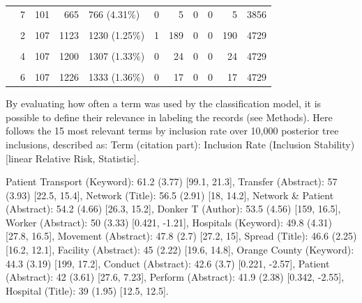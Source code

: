 \documentclass{article}
\begin{document}
\begin{table}[!h]
{\begin{tabular}[t]{llrrlrrrrrr}
 & 7 & 101 & 665 & 766 (4.31\%) & 0 & 5 & 0 & 0 & 5 & 3856\\
\cellcolor{gray!6}{Session2 (n = 98371)} & \cellcolor{gray!6}{1} & \cellcolor{gray!6}{106} & \cellcolor{gray!6}{934} & \cellcolor{gray!6}{1040 (1.06\%)} & \cellcolor{gray!6}{5} & \cellcolor{gray!6}{270} & \cellcolor{gray!6}{998} & \cellcolor{gray!6}{0} & \cellcolor{gray!6}{1273} & \cellcolor{gray!6}{4729}\\
 & 2 & 107 & 1123 & 1230 (1.25\%) & 1 & 189 & 0 & 0 & 190 & 4729\\
\addlinespace
\cellcolor{gray!6}{} & \cellcolor{gray!6}{3} & \cellcolor{gray!6}{107} & \cellcolor{gray!6}{1176} & \cellcolor{gray!6}{1283 (1.3\%)} & \cellcolor{gray!6}{0} & \cellcolor{gray!6}{53} & \cellcolor{gray!6}{0} & \cellcolor{gray!6}{0} & \cellcolor{gray!6}{53} & \cellcolor{gray!6}{4733}\\
 & 4 & 107 & 1200 & 1307 (1.33\%) & 0 & 24 & 0 & 0 & 24 & 4729\\
\cellcolor{gray!6}{} & \cellcolor{gray!6}{5} & \cellcolor{gray!6}{107} & \cellcolor{gray!6}{1209} & \cellcolor{gray!6}{1316 (1.34\%)} & \cellcolor{gray!6}{0} & \cellcolor{gray!6}{9} & \cellcolor{gray!6}{0} & \cellcolor{gray!6}{0} & \cellcolor{gray!6}{9} & \cellcolor{gray!6}{4729}\\
 & 6 & 107 & 1226 & 1333 (1.36\%) & 0 & 17 & 0 & 0 & 17 & 4729\\
\bottomrule
\end{tabular}}
\end{table}

By evaluating how often a term was used by the classification model, it
is possible to define their relevance in labeling the records (see
Methods). Here follows the 15 most relevant terms by inclusion rate over
10,000 posterior tree inclusions, described as: Term (citation part):
Inclusion Rate (Inclusion Stability) {[}linear Relative Risk,
Statistic{]}.

Patient Transport (Keyword): 61.2 (3.77) {[}99.1, 21.3{]}, Transfer
(Abstract): 57 (3.93) {[}22.5, 15.4{]}, Network (Title): 56.5 (2.91)
{[}18, 14.2{]}, Network \& Patient (Abstract): 54.2 (4.66) {[}26.3,
15.2{]}, Donker T (Author): 53.5 (4.56) {[}159, 16.5{]}, Worker
(Abstract): 50 (3.33) {[}0.421, -1.21{]}, Hospitals (Keyword): 49.8
(4.31) {[}27.8, 16.5{]}, Movement (Abstract): 47.8 (2.7) {[}27.2, 15{]},
Spread (Title): 46.6 (2.25) {[}16.2, 12.1{]}, Facility (Abstract): 45
(2.22) {[}19.6, 14.8{]}, Orange County (Keyword): 44.3 (3.19) {[}199,
17.2{]}, Conduct (Abstract): 42.6 (3.7) {[}0.221, -2.57{]}, Patient
(Abstract): 42 (3.61) {[}27.6, 7.23{]}, Perform (Abstract): 41.9 (2.38)
{[}0.342, -2.55{]}, Hospital (Title): 39 (1.95) {[}12.5, 12.5{]}.
\end{document}
